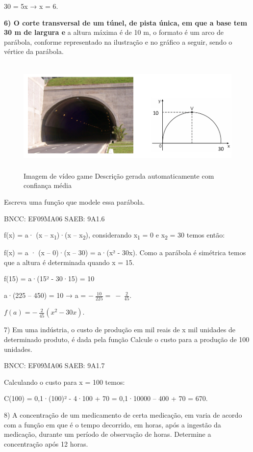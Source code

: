 \begin{escolha}
{{{\begin{escolha}
{30 = 5x → x = 6.

\textbf{6) O corte transversal de um túnel, de pista única, em que a
base tem 30 m de largura e} a altura máxima é de 10 m, o formato é um
arco de parábola, conforme representado na ilustração e no gráfico a
seguir, sendo o vértice da parábola.

\begin{figure}
\centering
\includegraphics[width=5.56667in,height=2.24198in]{./_SAEB_9_MAT/media/image143.png}
\caption{Imagem de vídeo game Descrição gerada automaticamente com
confiança média}
\end{figure}

Escreva uma função que modele essa parábola.

BNCC: EF09MA06 SAEB: 9A1.6

f(x) = a· (x -- x\textsubscript{1})·(x -- x\textsubscript{2}),
considerando x\textsubscript{1} = 0 e x\textsubscript{2} = 30 temos
então:

f(x) = a · (x -- 0)·(x -- 30) = a·(x² - 30x). Como a parábola é
simétrica temos que a altura é determinada quando x = 15.

f(15) = a·(15² - 30·15) = 10

a·(225 -- 450) = 10 → a = \(- \ \frac{10}{225} = \  - \ \frac{2}{45}\).

\(f\left( a \right) = - \ \frac{2}{45}(x^{2} - 30x)\).

7) Em uma indústria, o custo de produção em mil reais de x mil unidades
de determinado produto, é dada pela função Calcule o custo para a
produção de 100 unidades.

BNCC: EF09MA06 SAEB: 9A1.7

Calculando o custo para x = 100 temos:

C(100) = 0,1·(100)² - 4·100 + 70 = 0,1·10000 -- 400 + 70 = 670.

8) A concentração de um medicamento de certa medicação, em varia de
acordo com a função em que é o tempo decorrido, em horas, após a
ingestão da medicação, durante um período de observação de horas.
Determine a concentração após 12 horas.

}
\end{escolha}}}}
\end{escolha}
